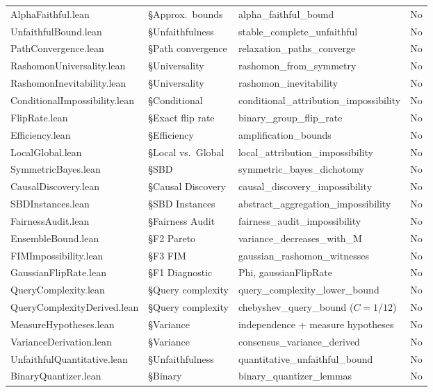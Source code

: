 \documentclass{article}
\begin{document}
\begin{table}[htbp]
\begin{tabular}{@{}l>{\raggedright\arraybackslash}p{3cm}>{\raggedright\arraybackslash}p{5.5cm}l@{}}
AlphaFaithful.lean & \S Approx.\ bounds & alpha\_faithful\_bound & No \\
UnfaithfulBound.lean & \S Unfaithfulness & stable\_complete\_unfaithful & No \\
PathConvergence.lean & \S Path convergence & relaxation\_paths\_converge & No \\
RashomonUniversality.lean & \S Universality & rashomon\_from\_symmetry & No \\
RashomonInevitability.lean & \S Universality & rashomon\_inevitability & No \\
ConditionalImpossibility.lean & \S Conditional & conditional\_attribution\_impossibility & No \\
FlipRate.lean & \S Exact flip rate & binary\_group\_flip\_rate & No \\
Efficiency.lean & \S Efficiency & amplification\_bounds & No \\
LocalGlobal.lean & \S Local vs.\ Global & local\_attribution\_impossibility & No \\
SymmetricBayes.lean & \S SBD & symmetric\_bayes\_dichotomy & No \\
CausalDiscovery.lean & \S Causal Discovery & causal\_discovery\_impossibility & No \\
SBDInstances.lean & \S SBD Instances & abstract\_aggregation\_impossibility & No \\
FairnessAudit.lean & \S Fairness Audit & fairness\_audit\_impossibility & No \\
EnsembleBound.lean & \S F2 Pareto & variance\_decreases\_with\_M & No \\
FIMImpossibility.lean & \S F3 FIM & gaussian\_rashomon\_witnesses & No \\
GaussianFlipRate.lean & \S F1 Diagnostic & Phi, gaussianFlipRate & No \\
QueryComplexity.lean & \S Query complexity & query\_complexity\_lower\_bound & No \\
QueryComplexityDerived.lean & \S Query complexity & chebyshev\_query\_bound ($C{=}1/12$) & No \\
MeasureHypotheses.lean & \S Variance & independence + measure hypotheses & No \\
VarianceDerivation.lean & \S Variance & consensus\_variance\_derived & No \\
UnfaithfulQuantitative.lean & \S Unfaithfulness & quantitative\_unfaithful\_bound & No \\
BinaryQuantizer.lean & \S Binary & binary\_quantizer\_lemmas & No \\

\end{tabular}
\end{table}
\end{document}
